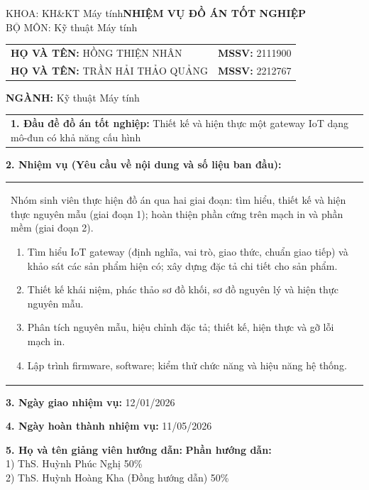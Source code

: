 
\hphantom{..}KHOA: KH\&KT Máy tính\hfill \textbf{\fontsize{14}{16}\selectfont NHIỆM VỤ ĐỒ ÁN TỐT NGHIỆP}\\
\hphantom{..}BỘ MÔN: Kỹ thuật Máy tính\hfill 

\vspace{5pt}
    \begin{tabular}{l l}
    \textbf{HỌ VÀ TÊN:} HỒNG THIỆN NHÂN & \textbf{MSSV:} 2111900 \\
    \textbf{HỌ VÀ TÊN:} TRẦN HẢI THẢO QUẢNG & \textbf{MSSV:} 2212767 \\
    \end{tabular}

\hphantom{..}\textbf{NGÀNH:} Kỹ thuật Máy tính

\begin{tabular}{p{\textwidth}}
    \textbf{1. Đầu đề đồ án tốt nghiệp:} Thiết kế và hiện thực một gateway IoT dạng mô-đun có khả năng cấu hình    
\end{tabular}

\hphantom{..}\textbf{2. Nhiệm vụ (Yêu cầu về nội dung và số liệu ban đầu):} \\
\begin{tabular}{p{\textwidth}}
Nhóm sinh viên thực hiện đồ án qua hai giai đoạn: tìm hiểu, thiết kế và hiện thực nguyên mẫu (giai đoạn 1); hoàn thiện phần cứng trên mạch in và phần mềm (giai đoạn 2).
\begin{enumerate}
    \item Tìm hiểu IoT gateway (định nghĩa, vai trò, giao thức, chuẩn giao tiếp) và khảo sát các sản phẩm hiện có; xây dựng đặc tả chi tiết cho sản phẩm.
    \item Thiết kế khái niệm, phác thảo sơ đồ khối, sơ đồ nguyên lý và hiện thực nguyên mẫu.
    \item Phân tích nguyên mẫu, hiệu chỉnh đặc tả; thiết kế, hiện thực và gỡ lỗi mạch in.
    \item Lập trình firmware, software; kiểm thử chức năng và hiệu năng hệ thống.
\end{enumerate}
\end{tabular}

\hphantom{..}\textbf{3. Ngày giao nhiệm vụ:} 12/01/2026

\hphantom{..}\textbf{4. Ngày hoàn thành nhiệm vụ:} 11/05/2026

\hphantom{..}\textbf{5. Họ và tên giảng viên hướng dẫn:} \hfill \textbf{Phần hướng dẫn:}\\
\hphantom{..}1) ThS. Huỳnh Phúc Nghị \hfill 50\%\\
\hphantom{..}2) ThS. Huỳnh Hoàng Kha (Đồng hướng dẫn) \hfill 50\%\\

